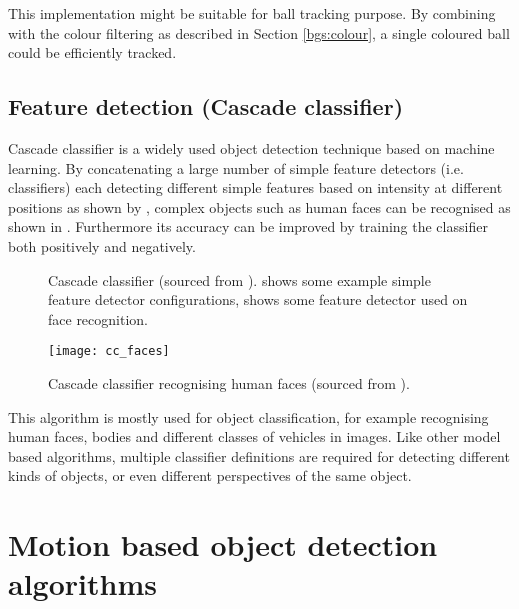This implementation might be suitable for ball tracking purpose. By combining with the colour filtering as described in Section \ref{bgs:colour}, a single coloured ball could be efficiently tracked.

\subsection{Feature detection (Cascade classifier)}
\label{sec:bg:cc}


Cascade classifier \cite{cascade} \cite{viola2001rapid} is a widely used object detection technique based on machine learning. By concatenating a large number of simple feature detectors (i.e. classifiers) each detecting different simple features based on intensity at different positions as shown by , complex objects such as human faces can be recognised as shown in . Furthermore its accuracy can be improved by training the classifier both positively and negatively.

\begin{figure}[H]
  \centering
  \caption{Cascade classifier (sourced from \cite{borovicka2003circle}).  shows some example simple feature detector configurations,  shows some feature detector used on face recognition.}
  \label{bg:cc}
\end{figure}

\begin{figure}[H]
  \centering
  \texttt{[image: cc\_faces]}
  \caption{Cascade classifier recognising human faces (sourced from \cite{borovicka2003circle}).}
  \label{cc:faces}
\end{figure}

This algorithm is mostly used for object classification, for example recognising human faces, bodies and different classes of vehicles in images. Like other model based algorithms, multiple classifier definitions are required for detecting different kinds of objects, or even different perspectives of the same object.


\section{Motion based object detection algorithms}

